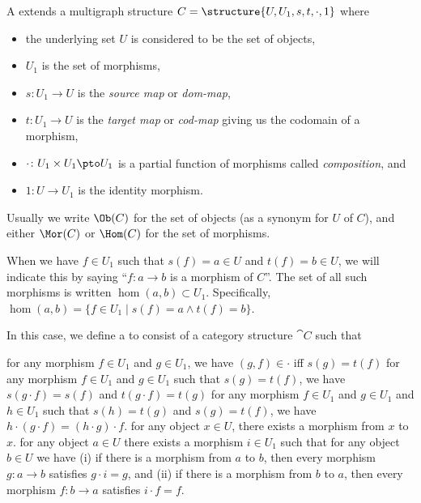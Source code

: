 \begin{definition}
A  extends a multigraph structure $C=\structure{U,U_{1},s,t,\cdot,1}$ where
\begin{itemize}
\item the underlying set $U$ is considered to be the set of objects,
\item $U_{1}$ is the set of morphisms,
\item $s\colon U_{1}\to U$ is the \emph{source map} 
or \emph{dom-map},
\item $t\colon U_{1}\to U$ is the \emph{target map} or
\emph{cod-map} giving us the codomain of a morphism,
\item $\cdot\colon U_{1}\times U_{1}\pto U_{1}$ is a partial function
  of morphisms called \emph{composition}, and
\item $1\colon U\to U_{1}$ is the identity morphism.
\end{itemize}
Usually we write $\Ob(C)$ for the set of objects (as a synonym for $U$
of $C$), and either $\Mor(C)$ or $\Hom(C)$ for the set of morphisms.

When we have $f\in U_{1}$ such that $s(f)=a\in U$ and $t(f)=b\in U$,
we will indicate this by saying ``$f\colon a\to b$ is a morphism of $C$''.
The set of all such morphisms is written $\hom(a,b)\subset U_{1}$. Specifically,
$\hom(a,b)=\{f\in U_{1}\mid s(f)=a\land t(f)=b\}$.

In this case, we define a  to consist of a category
structure $\cat{C}$ such that
\begin{itemize}
 for any morphism $f\in U_{1}$ and $g\in U_{1}$,
  we have $(g,f)\in\cdot$ iff $s(g)=t(f)$
 for any morphism $f\in U_{1}$ and $g\in U_{1}$
  such that $s(g)=t(f)$, we have $s(g\cdot f)=s(f)$ and $t(g\cdot f)=t(g)$
 for any morphism $f\in U_{1}$ and $g\in U_{1}$
  and $h\in U_{1}$
  such that $s(h) = t(g)$ and $s(g)=t(f)$,
  we have $h\cdot(g\cdot f)=(h\cdot g)\cdot f$.
 for any object $x\in U$, there exists a morphism
  from $x$ to $x$.
 for any object $a\in U$ there exists a
  morphism $i\in U_{1}$ such that for any object $b\in U$ we have
  (i) if there is a morphism from $a$ to $b$, then every morphism
  $g\colon a\to b$ satisfies $g\cdot i=g$, and\hfill\break
  (ii) if there is a morphism from $b$ to $a$, then every morphism
  $f\colon b\to a$ satisfies $i\cdot f=f$.
\end{itemize}
\end{definition}

